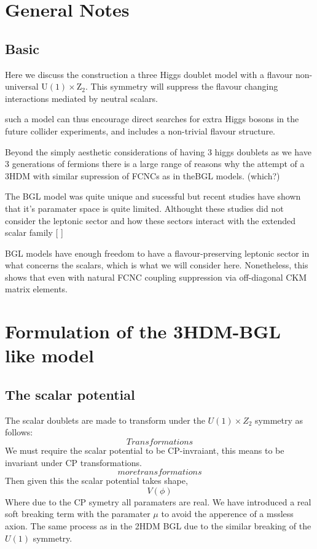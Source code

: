 \section{General Notes}

\subsection{Basic}

Here we discuss the construction a three Higgs doublet model with a flavour non-universal $\mathrm{U(1)}\times\mathrm{Z_2}$. This symmetry will suppress the flavour changing interactions mediated by neutral scalars. 

such a model can thus encourage direct searches for extra Higgs bosons in the future collider experiments, and includes a
non-trivial flavour structure.

Beyond the simply aesthetic considerations of having 3 higgs doublets as we have 3 generations of fermions there is a large range of reasons why the attempt of a 3HDM with similar supression of FCNCs as in theBGL models. (which?) 

The BGL model was quite unique and sucessful but recent studies have shown that it's paramater space is quite limited. Althought these studies did not consider the leptonic sector and how these sectors interact with the extended scalar family [
]

BGL models have enough freedom to have a flavour-preserving leptonic sector in what concerns the scalars, which is what we will consider here. Nonetheless, this shows that even with natural FCNC coupling suppression via off-diagonal CKM matrix elements. 

\section{Formulation of the 3HDM-BGL like model}

\subsection{The scalar potential}

The scalar doublets are made to transform under the $U(1) \times Z_2$ symmetry as follows: 
\begin{equation}
Transformations 
\end{equation}
We must require the scalar potential to be CP-invraiant, this means to be invariant under CP transformations. 
\begin{equation}
more transformations
\end{equation}
Then given this the scalar potential takes shape,
\begin{equation}
V(\phi)
\end{equation}
Where due to the CP symetry all paramaters are real. We have introduced a real soft breaking term with the paramater $\mu$ to avoid the apperence of a mssless axion. The same process as in the 2HDM BGL due to the similar breaking of the $U(1)$ symmetry. 

